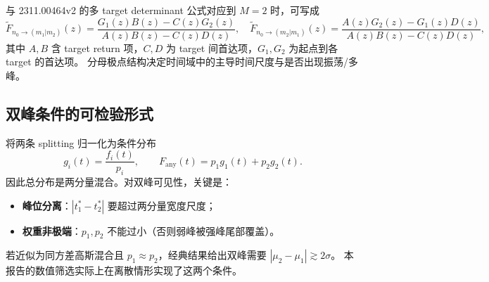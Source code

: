 \documentclass[11pt,fontset=fandol]{ctexart}
\begin{document}
与 2311.00464v2 的多 target determinant 公式对应到 $M=2$ 时，可写成
\begin{equation}
\tilde F_{n_0\to(m_1|m_2)}(z)=\frac{G_1(z)B(z)-C(z)G_2(z)}{A(z)B(z)-C(z)D(z)},\quad
\tilde F_{n_0\to(m_2|m_1)}(z)=\frac{A(z)G_2(z)-G_1(z)D(z)}{A(z)B(z)-C(z)D(z)},
\end{equation}
其中 $A,B$ 含 target return 项，$C,D$ 为 target 间首达项，$G_1,G_2$ 为起点到各 target 的首达项。
分母极点结构决定时间域中的主导时间尺度与是否出现振荡/多峰。

\subsection{双峰条件的可检验形式}
将两条 splitting 归一化为条件分布
\begin{equation}
g_i(t)=\frac{f_i(t)}{p_i},\qquad
F_{\mathrm{any}}(t)=p_1g_1(t)+p_2g_2(t).
\end{equation}
因此总分布是两分量混合。对双峰可见性，关键是：
\begin{itemize}
  \item \textbf{峰位分离}：$|t_1^*-t_2^*|$ 要超过两分量宽度尺度；
  \item \textbf{权重非极端}：$p_1,p_2$ 不能过小（否则弱峰被强峰尾部覆盖）。
\end{itemize}
若近似为同方差高斯混合且 $p_1\approx p_2$，经典结果给出双峰需要 $|\mu_2-\mu_1|\gtrsim2\sigma$。
本报告的数值筛选实际上在离散情形实现了这两个条件。
\end{document}
